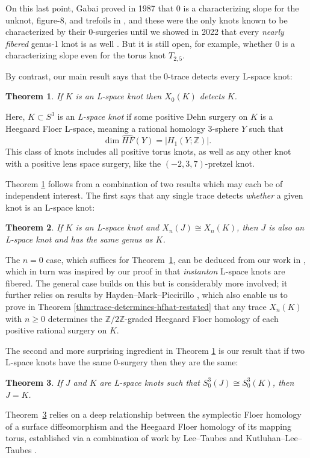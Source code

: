 \documentclass[11pt]{amsart}
\newtheorem {theorem}{Theorem}
\numberwithin{equation}{section}
\numberwithin{theorem}{section}
\theoremstyle{definition}
\newcommand{\Z}{\mathbb{Z}}
\newcommand{\hfhat}{\widehat{\mathit{HF}}}
\begin{document}
On this last point, Gabai proved in 1987 that $0$ is a characterizing slope for the unknot, figure-8, and trefoils in  \cite{gabai-foliations3}, and these were the only knots known to be characterized by their $0$-surgeries until we showed in 2022 that every \emph{nearly fibered} genus-1 knot is as well \cite{bs-nonfibered,bs-0-characterizing}. But it is still open, for example,  whether $0$ is a characterizing slope even for the torus knot $T_{2,5}$.

By contrast, our main result says that the $0$-trace detects every L-space knot:
\begin{theorem}
\label{thm:main}
If $K$ is an L-space knot then $X_0(K)$ detects $K$.
\end{theorem}

Here, $K\subset S^3$ is an \emph{L-space knot} if some positive Dehn surgery on $K$ is a Heegaard Floer L-space, meaning a rational homology 3-sphere $Y$ such that 
\[\dim \hfhat(Y) = |H_1(Y;\Z)|.\]
This class of knots includes all positive torus knots, as well as any other knot with a positive lens space surgery, like the $(-2,3,7)$-pretzel knot.

Theorem \ref{thm:main} follows from a combination of two results which may each be of independent interest. The first  says that any single trace detects \emph{whether} a given knot is an L-space knot:

\begin{theorem} \label{thm:lspace-detection-main}
If $K$ is an L-space knot and $X_n(J) \cong X_n(K)$, then $J$ is also an L-space knot and has the same genus as $K$. 
\end{theorem}

The $n=0$ case, which suffices for Theorem~\ref{thm:main}, can be deduced from our work in \cite{bs-fibered-sqp}, which in turn was inspired by our proof in \cite{bs-lspace} that \emph{instanton} L-space knots are fibered.  The general case builds on this but is considerably more involved; it further relies on results by Hayden--Mark--Piccirillo \cite{hayden-mark-piccirillo}, which also enable us to prove in Theorem \ref{thm:trace-determines-hfhat-restated} that any trace $X_n(K)$ with $n\geq 0$  determines the $\Z/2\Z$-graded Heegaard Floer homology of each positive rational surgery on $K$.

The second and more surprising ingredient in Theorem \ref{thm:main} is our result that if two L-space knots have the same 0-surgery then they are the same:
\begin{theorem} \label{thm:main-lspace-zero}
If $J$ and $K$ are L-space knots such that $S^3_0(J) \cong S^3_0(K)$, then $J=K$.
\end{theorem}
Theorem~\ref{thm:main-lspace-zero} relies on a deep relationship between the symplectic Floer homology of a surface diffeomorphism and the Heegaard Floer homology of its mapping torus, established via a combination of  work by Lee--Taubes \cite{lee-taubes} and Kutluhan--Lee--Taubes \cite{klt1}.
\end{document}
